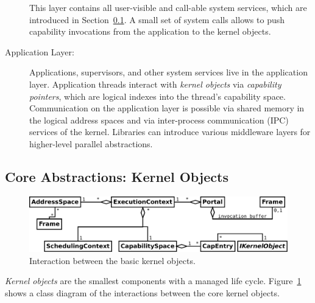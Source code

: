 \begin{description}
This layer contains all user-visible and call-able system services, which are introduced in Section~\ref{sec:kernel-objects}. A small set of system calls allows to push capability invocations from the application to the kernel objects.

\item[Application Layer:] Applications, supervisors, and other system services live in the application layer. Application threads interact with \emph{kernel objects} via \emph{capability pointers}, which are logical indexes into the thread's capability space. Communication on the application layer is possible via shared memory in the logical address spaces and via inter-process communication (IPC) services of the kernel. Libraries can introduce various middleware layers for higher-level parallel abstractions.
\end{description}

\subsection{Core Abstractions: Kernel Objects}
\label{sec:kernel-objects}

\begin{figure}
  \centering
  \includegraphics[scale=0.25]{fig/kernel-objects-logical.pdf}
  \caption{Interaction between the basic kernel objects.}
  \label{fig:kernel-objects-logical}
\end{figure}

\emph{Kernel objects} are the smallest components with a managed life cycle. Figure~\ref{fig:kernel-objects-logical} shows a class diagram of the interactions between the core kernel objects. 

